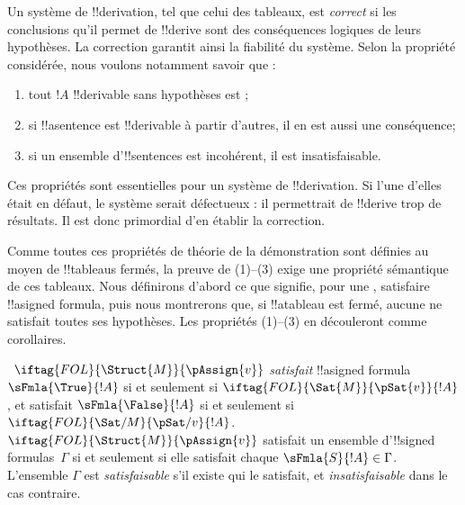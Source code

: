 \documentclass[../../../include/open-logic-section]{subfiles}
\begin{document}
      {}
      {}
      

\begin{explain}
Un système de !!{derivation}, tel que celui des tableaux, est
\emph{correct} si les conclusions qu'il permet de !!{derive} sont
des conséquences logiques de leurs hypothèses. La correction
garantit ainsi la fiabilité du système. Selon la propriété considérée,
nous voulons notamment savoir que :
\begin{enumerate}
\item tout $!A$ !!{derivable} sans hypothèses est
   ;
\item si !!a{sentence} est !!{derivable} à partir d'autres, il en est
  aussi une conséquence;
\item si un ensemble d'!!{sentence}s est incohérent, il est
  insatisfaisable.
\end{enumerate}
Ces propriétés sont essentielles pour un système de !!{derivation}.
Si l'une d'elles était en défaut, le système serait défectueux : il
permettrait de !!{derive} trop de résultats. Il est donc primordial
d'en établir la correction.

Comme toutes ces propriétés de théorie de la démonstration sont
définies au moyen de !!{tableau}s fermés, la preuve de (1)--(3) exige
une propriété sémantique de ces tableaux. Nous définirons d'abord ce
que signifie, pour une , satisfaire
!!a{signed formula}, puis nous montrerons que, si !!a{tableau} est
fermé, aucune  ne satisfait toutes ses
hypothèses. Les propriétés (1)--(3) en découleront comme corollaires.
\end{explain}

\begin{defn}
~$\iftag{FOL}{\Struct{M}}{\pAssign{v}}$
\emph{satisfait} !!a{signed formula} $\sFmla{\True}{!A}$ si et seulement si
$\iftag{FOL}{\Sat{M}}{\pSat{v}}{!A}$, et satisfait
$\sFmla{\False}{!A}$ si et seulement si
$\iftag{FOL}{\Sat/{M}}{\pSat/{v}}{!A}$. $\iftag{FOL}{\Struct{M}}{\pAssign{v}}$
  satisfait un ensemble d'!!{signed formula}s~$\Gamma$ si et seulement
  si elle satisfait chaque $\sFmla{S}{!A} \in \Gamma$. L'ensemble
  $\Gamma$ est \emph{satisfaisable} s'il existe
   qui le satisfait, et
\emph{insatisfaisable} dans le cas contraire.
\end{defn}
\end{document}
